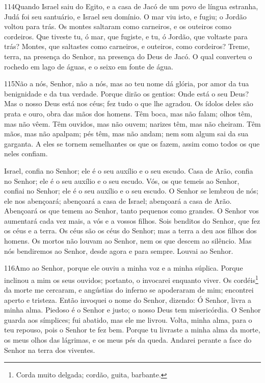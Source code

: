 \bigskip

\lettrine{114}{}Quando Israel saiu do Egito, e a casa de Jacó
de um povo de língua estranha, Judá foi seu santuário, e Israel
seu domínio. O mar viu isto, e fugiu; o Jordão voltou para trás.
Os montes saltaram como carneiros, e os outeiros como cordeiros.
Que tiveste tu, ó mar, que fugiste, e tu, ó Jordão, que voltaste
para trás? Montes, que saltastes como carneiros, e outeiros,
como cordeiros? Treme, terra, na presença do Senhor, na presença
do Deus de Jacó. O qual converteu o rochedo em lago de águas, e
o seixo em fonte de água.

\bigskip

\lettrine{115}{}Não a nós, Senhor, não a nós, mas ao teu nome
dá glória, por amor da tua benignidade e da tua verdade. Porque
dirão os gentios: Onde está o seu Deus? Mas o nosso Deus está
nos céus; fez tudo o que lhe agradou. Os ídolos deles são prata
e ouro, obra das mãos dos homens. Têm boca, mas não falam; olhos
têm, mas não vêem. Têm ouvidos, mas não ouvem; narizes têm, mas
não cheiram. Têm mãos, mas não apalpam; pés têm, mas não andam;
nem som algum sai da sua garganta. A eles se tornem semelhantes
os que os fazem, assim como todos os que neles confiam.

Israel, confia no Senhor; ele é o seu auxílio e o seu escudo.
Casa de Arão, confia no Senhor; ele é o seu auxílio e o seu
escudo. Vós, os que temeis ao Senhor, confiai no Senhor; ele
é o seu auxílio e o seu escudo. O Senhor se lembrou de nós;
ele nos abençoará; abençoará a casa de Israel; abençoará a casa de
Arão. Abençoará os que temem ao Senhor, tanto pequenos como
grandes. O Senhor vos aumentará cada vez mais, a vós e a
vossos filhos. Sois benditos do Senhor, que fez os céus e a
terra. Os céus são os céus do Senhor; mas a terra a deu aos
filhos dos homens. Os mortos não louvam ao Senhor, nem os que
descem ao silêncio. Mas nós bendiremos ao Senhor, desde agora
e para sempre. Louvai ao Senhor.

\bigskip

\lettrine{116}{}Amo ao Senhor, porque ele ouviu a minha voz e a
minha súplica. Porque inclinou a mim os seus ouvidos; portanto,
o invocarei enquanto viver. Os cordéis\footnote{Corda muito
delgada; cordão, guita, barbante.} da morte me cercaram, e angústias
do inferno se apoderaram de mim; encontrei aperto e tristeza.
Então invoquei o nome do Senhor, dizendo: Ó Senhor, livra a
minha alma. Piedoso é o Senhor e justo; o nosso Deus tem
misericórdia. O Senhor guarda aos símplices; fui abatido, mas
ele me livrou. Volta, minha alma, para o teu repouso, pois o
Senhor te fez bem. Porque tu livraste a minha alma da morte, os
meus olhos das lágrimas, e os meus pés da queda. Andarei perante
a face do Senhor na terra dos viventes.

